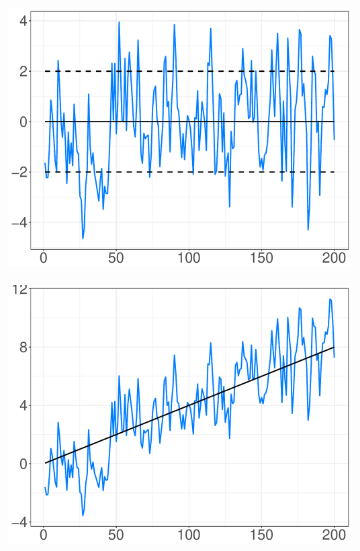 \documentclass[11pt]{dippg}
\begin{document}
\begin{figure}[!ht]
\centering
\begin{subfigure}{.45\textwidth}
 \centering
 \includegraphics[width=1\linewidth]{images/stationary_ts.pdf}
 \caption{}
 \label{fig:stationary}
\end{subfigure}
\begin{subfigure}{.45\textwidth}
 \centering
 \includegraphics[width=1\linewidth]{images/trend-stationary_ts.pdf}
 \caption{}
 \label{fig:trend-stationary}
\end{subfigure}
\begin{subfigure}{.45\textwidth}
 \centering

\end{subfigure}
\end{figure}
\end{document}
